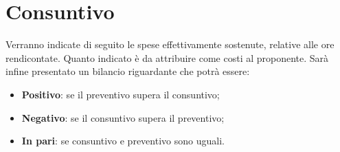 

\section{Consuntivo} %
\label{sec:consuntivo}
Verranno indicate di seguito le spese effettivamente sostenute, relative alle ore rendicontate. Quanto indicato è da attribuire come costi al proponente. \newline
Sarà infine presentato un bilancio riguardante che potrà essere:
	\begin{itemize}
		\item \textbf{Positivo}: se il preventivo supera il consuntivo;
		\item \textbf{Negativo}: se il consuntivo supera il preventivo;
		\item \textbf{In pari}: se consuntivo e preventivo sono uguali.
	\end{itemize}

